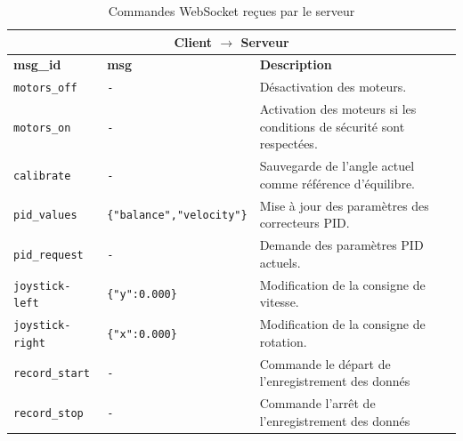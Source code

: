 \begin{table}[H]
\centering
\begin{tabularx}{\textwidth}{|l|l|X|}
\hline
\multicolumn{3}{|c|}{\textbf{Client $\rightarrow$ Serveur}} \\
\hline
\textbf{msg\_id} & \textbf{msg} & \textbf{Description} \\
\hline
\texttt{motors\_off} & \texttt{-} & Désactivation des moteurs. \\
\hline
\texttt{motors\_on} & \texttt{-} & Activation des moteurs si les conditions de sécurité sont respectées. \\
\hline
\texttt{calibrate} & \texttt{-} & Sauvegarde de l'angle actuel comme référence d'équilibre. \\
\hline
\texttt{pid\_values} & \texttt{\{"balance","velocity"\}} & Mise à jour des paramètres des correcteurs PID. \\
\hline
\texttt{pid\_request} & \texttt{-} & Demande des paramètres PID actuels. \\
\hline
\texttt{joystick-left} & \texttt{\{"y":0.000\}} & Modification de la consigne de vitesse. \\
\hline
\texttt{joystick-right} & \texttt{\{"x":0.000\}} & Modification de la consigne de rotation. \\
\hline
\texttt{record\_start} & \texttt{-} & Commande le départ de l'enregistrement des donnés \\
\hline
\texttt{record\_stop} & \texttt{-} & Commande l'arrêt de l'enregistrement des donnés\\
\hline
\end{tabularx}
\caption{Commandes WebSocket reçues par le serveur}
\end{table}

